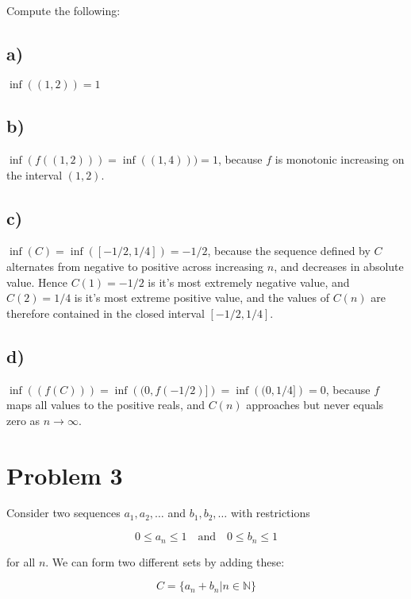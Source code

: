 \documentclass{article}
\newcommand{\N}{\mathbb{N}}
\begin{document}
Compute the following: 

\subsection*{a)}

$\inf\left( (1, 2) \right) = 1$

\subsection*{b)}

$\inf(f\left( (1, 2) \right)) = \inf\left( (1, 4) \right)) = 1$, because $f$ is monotonic increasing on the interval $(1, 2)$. 

\subsection*{c)}

$\inf(C) = \inf\left( [-1/2, 1/4] \right) = -1/2$, because the sequence defined by $C$ alternates from negative to positive across increasing $n$, and decreases in absolute value. Hence $C(1) = -1/2$ is it's most extremely negative value, and $C(2) = 1/4$ is it's most extreme positive value, and the values of $C(n)$ are therefore contained in the closed interval $[-1/2, 1/4]$. 

\subsection*{d)}

$\inf\left( (f(C)) \right) = \inf\left( (0, f(-1/2)] \right) = \inf\left( (0, 1/4] \right) = 0$, because $f$ maps all values to the positive reals, and $C(n)$ approaches but never equals zero  as $n \rightarrow \infty$.

\section*{Problem 3}

Consider two sequences $a_1, a_2, \dots$ and $b_1, b_2, \dots$ with restrictions

\begin{equation*}
  0 \leq a_n \leq 1 \quad \text{and} \quad 0 \leq b_n \leq 1
\end{equation*}

for all $n$. We can form two different sets by adding these:

\begin{equation*}
  C = \{a_n + b_n | n \in \N\}
\end{equation*}
\end{document}
